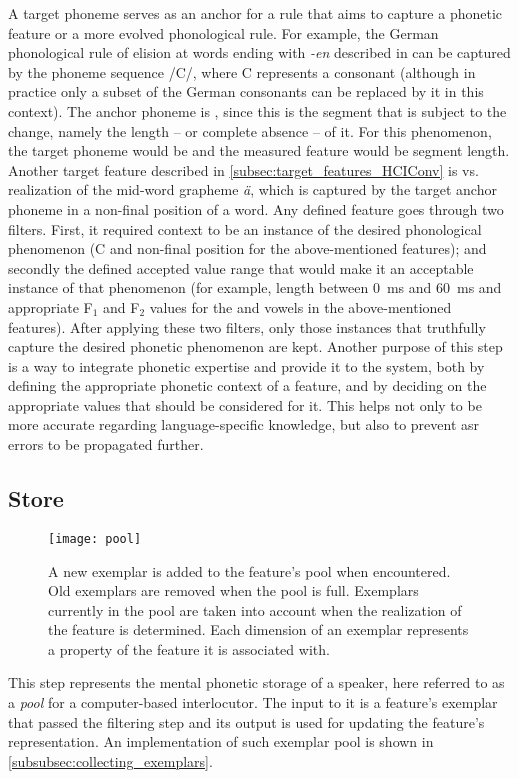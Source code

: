 A target phoneme serves as an anchor for a rule that aims to capture a phonetic feature or a more evolved phonological rule.
For example, the German phonological rule of \textipa{[@]} elision at words ending with \emph{-en} described in  can be captured by the phoneme sequence /C/, where C represents a consonant (although in practice only a subset of the German consonants can be replaced by it in this context).
The anchor phoneme is \textipa{[@]}, since this is the segment that is subject to the change, namely the length -- or complete absence -- of it.
For this phenomenon, the target phoneme would be  and the measured feature would be segment length.
Another target feature described in \cref{subsec:target_features_HCIConv} is \textipa{[e:]} vs.\ \textipa{[E:]} realization of the mid-word grapheme \emph{ä}, which is captured by the target anchor phoneme \textipa{[E]} in a non-final position of a word.
Any defined feature goes through two filters. First, it required context to be an instance of the desired phonological phenomenon (C and non-final position for the above-mentioned features);
and secondly the defined accepted value range that would make it an acceptable instance of that phenomenon (for example, \textipa{[@]} length between \SI{0}{\milli\second} and \SI{60}{\milli\second} and appropriate F$_1$ and F$_2$ values for the \textipa{[e:]} and \textipa{[E:]} vowels in the above-mentioned features).
After applying these two filters, only those instances that truthfully capture the desired phonetic phenomenon are kept.
Another purpose of this step is a way to integrate phonetic expertise and provide it to the system, both by defining the appropriate phonetic context of a feature, and by deciding on the appropriate values that should be considered for it.
This helps not only to be more accurate regarding language-specific knowledge, but also to prevent \ac{asr} errors to be propagated further.

\subsection{Store}
\label{subsec:store}

\begin{figure}[t]
	\centering
	\texttt{[image: pool]}
	\caption[The exemplar pool]
		{A new exemplar is added to the feature's pool when encountered.
		Old exemplars are removed when the pool is full.
		Exemplars currently in the pool are taken into account when the realization of the feature is determined.
		Each dimension of an exemplar represents a property of the feature it is associated with.}
	\label{fig:exemplar_pool}
\end{figure}
%
This step represents the mental phonetic storage of a speaker, here referred to as a \emph{pool} for a computer-based interlocutor.
The input to it is a feature's exemplar that passed the filtering step and its output is used for updating the feature's representation.
An implementation of such exemplar pool is shown in \cref{subsubsec:collecting_exemplars}.

